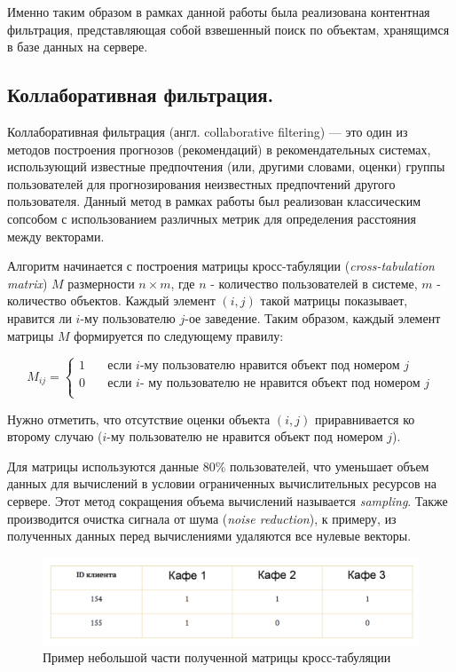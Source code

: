 Именно таким образом в рамках данной работы была реализована контентная фильтрация, представляющая собой взвешенный поиск по объектам, хранящимся в базе данных на сервере.

\subsection{Коллаборативная фильтрация.}

Коллаборативная фильтрация (англ. collaborative filtering) — это один из методов построения прогнозов (рекомендаций) в рекомендательных системах, использующий известные предпочтения (или, другими словами, оценки) группы пользователей для прогнозирования неизвестных предпочтений другого пользователя. Данный метод в рамках работы был реализован классическим сопсобом с использованием различных метрик для определения расстояния между векторами.

Алгоритм начинается с построения матрицы кросс-табуляции (\textit
{cross-tabulation matrix}) $M$ размерности $n \times m$, где $n$ - количество пользователей в системе, $m$ - количество объектов. Каждый элемент $(i,j)$ такой матрицы показывает, нравится ли $i$-му пользователю $j$-ое заведение. Таким образом, каждый элемент матрицы $M$ формируется по следующему правилу:

\[M_{ij} =
\begin{cases}
1       & \quad \text{если } i \text {-му пользователю нравится объект под номером } j\\
0      & \quad \text{если } i \text{- му пользователю не нравится объект под номером } j\\
\end{cases}
\]

 Нужно  отметить, что отсутствие оценки объекта $(i,j)$ приравнивается ко второму случаю ($i$-му пользователю не нравится объект под номером $j$).
 
 Для матрицы используются данные 80\% пользователей, что уменьшает объем данных для вычислений в условии ограниченных вычислительных ресурсов на сервере. Этот метод сокращения объема вычислений называется \textit
{sampling}. Также производится очистка сигнала от шума (\textit
{noise reduction}), к примеру, из полученных данных перед вычислениями удаляются все нулевые векторы.

\begin{figure}[H]%
	\centering
	\includegraphics[width=\textwidth]{img/matrix1.png}
	\caption{\label{fig:tan-aus}Пример небольшой части полученной матрицы кросс-табуляции}
\end{figure} 

